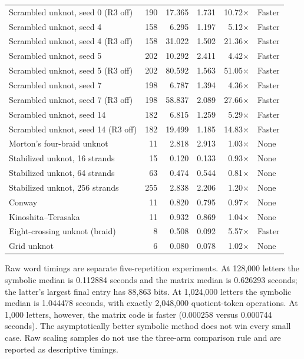 \documentclass[11pt,letterpaper]{article}
\theoremstyle{definition}
\begin{document}
\begin{longtable}{@{}p{}rrrrl@{}}
Scrambled unknot, seed 0 (R3 off) & 190 & 17.365 & 1.731 & 10.72\(\times\) & Faster \\
Scrambled unknot, seed 4 & 158 & 6.295 & 1.197 & 5.12\(\times\) & Faster \\
Scrambled unknot, seed 4 (R3 off) & 158 & 31.022 & 1.502 & 21.36\(\times\) & Faster \\
Scrambled unknot, seed 5 & 202 & 10.292 & 2.411 & 4.42\(\times\) & Faster \\
Scrambled unknot, seed 5 (R3 off) & 202 & 80.592 & 1.563 & 51.05\(\times\) & Faster \\
Scrambled unknot, seed 7 & 198 & 6.787 & 1.394 & 4.36\(\times\) & Faster \\
Scrambled unknot, seed 7 (R3 off) & 198 & 58.837 & 2.089 & 27.66\(\times\) & Faster \\
Scrambled unknot, seed 14 & 182 & 6.815 & 1.259 & 5.29\(\times\) & Faster \\
Scrambled unknot, seed 14 (R3 off) & 182 & 19.499 & 1.185 & 14.83\(\times\) & Faster \\
Morton's four-braid unknot & 11 & 2.818 & 2.913 & 1.03\(\times\) & None \\
Stabilized unknot, 16 strands & 15 & 0.120 & 0.133 & 0.93\(\times\) & None \\
Stabilized unknot, 64 strands & 63 & 0.474 & 0.544 & 0.81\(\times\) & None \\
Stabilized unknot, 256 strands & 255 & 2.838 & 2.206 & 1.20\(\times\) & None \\
Conway & 11 & 0.820 & 0.795 & 0.97\(\times\) & None \\
Kinoshita--Terasaka & 11 & 0.932 & 0.869 & 1.04\(\times\) & None \\
Eight-crossing unknot (braid) & 8 & 0.508 & 0.092 & 5.57\(\times\) & Faster \\
Grid unknot & 6 & 0.080 & 0.078 & 1.02\(\times\) & None \\
\end{longtable}
\endgroup

Raw word timings are separate five-repetition experiments. At 128,000
letters the symbolic median is 0.112884 seconds and the matrix median
is 0.626293 seconds; the latter's largest final entry has 88,863 bits.
At 1,024,000 letters the symbolic median is 1.044478 seconds, with exactly
2,048,000 quotient-token operations. At 1,000 letters, however, the matrix
code is faster (0.000258 versus 0.000744 seconds). The asymptotically better
symbolic method does not win every small case. Raw scaling samples do not
use the three-arm comparison rule and are reported as descriptive timings.
\end{document}

